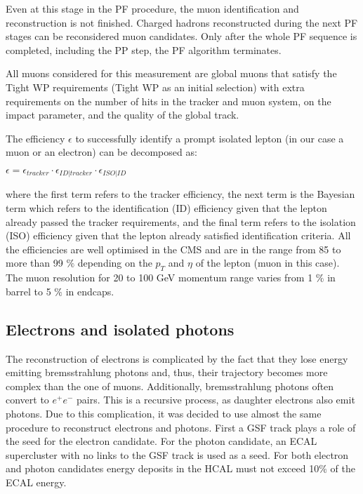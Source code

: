 Even at this stage in the PF procedure, the muon identification and reconstruction is not finished. Charged hadrons reconstructed during the next PF stages can be reconsidered muon candidates. Only after the whole PF sequence is completed, including the PP step, the PF algorithm terminates.

All muons considered for this measurement are global muons that satisfy the Tight WP requirements (Tight WP as an initial selection) with extra requirements on the number of hits in the tracker and muon system, on the impact parameter, and the quality of the global track. 

The efficiency $\epsilon$ to successfully identify a prompt isolated lepton (in our case a muon or an electron) can be decomposed as:

$\epsilon = \epsilon_{tracker} \cdot \epsilon_{ID | tracker} \cdot \epsilon_{ISO | ID} $

\noindent where the first term refers to the tracker efficiency, the next term is the Bayesian term which refers to the identification (ID) efficiency given that the lepton already passed the tracker requirements, and the final term refers to the isolation (ISO) efficiency given that the lepton already satisfied identification criteria. All the efficiencies are well optimised in the CMS and are in the range from 85 to more than 99 $\%$ depending on the $p_T$ and $\eta$ of the lepton (muon in this case). The muon resolution for 20 to 100 GeV momentum range varies from 1 $\%$ in barrel to 5 $\%$ in endcaps.

\subsection{Electrons and isolated photons}\label{sec:electrons}

The reconstruction of electrons is complicated by the fact that they lose energy emitting bremsstrahlung photons and, thus, their trajectory becomes more complex than the one of muons. Additionally, bremsstrahlung photons often convert to $e^+ e^-$ pairs. This is a recursive process, as daughter electrons also emit photons. Due to this complication, it was decided to use almost the same procedure to reconstruct electrons and photons. First a GSF track plays a role of the seed for the electron candidate. For the photon candidate, an ECAL supercluster with no links to the GSF track is used as a seed. For both electron and photon candidates energy deposits in the HCAL must not exceed 10$\%$ of the ECAL energy. 

